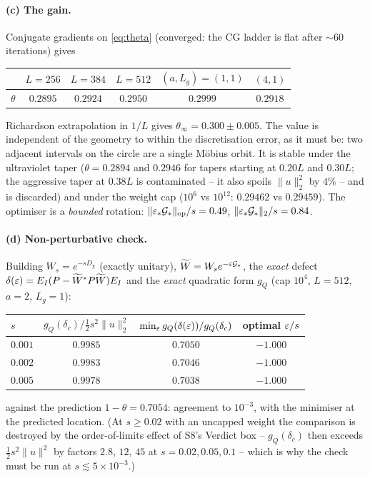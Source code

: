 \documentclass[11pt]{article}
\begin{document}
\paragraph{(c) The gain.}  Conjugate gradients on \eqref{eq:theta} (converged: the CG
ladder is flat after $\sim60$ iterations) gives
\begin{center}\small
\begin{tabular}{lccccc}
\toprule
 & $L=256$ & $L=384$ & $L=512$ & $(a,L_g)=(1,1)$ & $(4,1)$\\
\midrule
$\theta$ & $0.2895$ & $0.2924$ & $0.2950$ & $0.2999$ & $0.2918$\\
\bottomrule
\end{tabular}
\end{center}
Richardson extrapolation in $1/L$ gives $\theta_\infty=0.300\pm0.005$.  The value is
independent of the geometry to within the discretisation error, as it must be: two
adjacent intervals on the circle are a single M\"obius orbit.  It is stable under the
ultraviolet taper ($\theta=0.2894$ and $0.2946$ for tapers starting at $0.20L$ and
$0.30L$; the aggressive taper at $0.38L$ is contaminated -- it also spoils
$\|u\|_2^2$ by $4\%$ -- and is discarded) and under the weight cap
($10^{6}$ vs $10^{12}$: $0.29462$ vs $0.29459$).  The optimiser is a \emph{bounded}
rotation: $\|\varepsilon_*\mathcal G_*\|_{\rm op}/s=0.49$, $\|\varepsilon_*\mathcal G_*\|_2/s=0.84$.

\paragraph{(d) Non-perturbative check.}  Building $W_s=e^{-sD_\chi}$ (exactly unitary),
$\widetilde W=W_se^{-\varepsilon\mathcal G_*}$, the \emph{exact} defect
$\delta(\varepsilon)=E_I(P-\widetilde W^*P\widetilde W)E_I$ and the \emph{exact} quadratic form
$g_Q$ (cap $10^4$, $L=512$, $a=2$, $L_g=1$):
\begin{center}\small
\begin{tabular}{lccc}
\toprule
$s$ & $g_Q(\delta_c)\big/\tfrac12s^2\|u\|_2^2$ & $\min_\varepsilon g_Q(\delta(\varepsilon))/g_Q(\delta_c)$ & optimal $\varepsilon/s$\\
\midrule
$0.001$ & $0.9985$ & $0.7050$ & $-1.000$\\
$0.002$ & $0.9983$ & $0.7046$ & $-1.000$\\
$0.005$ & $0.9978$ & $0.7038$ & $-1.000$\\
\bottomrule
\end{tabular}
\end{center}
against the prediction $1-\theta=0.7054$: agreement to $10^{-3}$, with the minimiser at
the predicted location.  (At $s\ge0.02$ with an uncapped weight the comparison is
destroyed by the order-of-limits effect of S8's Verdict box -- $g_Q(\delta_c)$ then
exceeds $\tfrac12s^2\|u\|^2$ by factors $2.8$, $12$, $45$ at $s=0.02,0.05,0.1$ -- which
is why the check must be run at $s\lesssim5\times10^{-3}$.)
\end{document}
